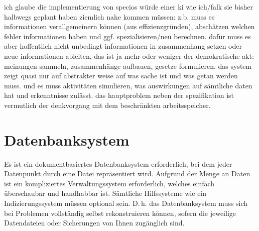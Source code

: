 ich glaube die implementierung von specios würde einer ki wie ich/falk sie bisher halbwegs geplant haben ziemlich nahe kommen müssen:
z.b. muss es informationen verallgemeinern können (aus effizienzgründen), abschätzen welchen fehler informationen haben und ggf. spezialisieren/neu berechnen. dafür muss es aber hoffentlich nicht unbedingt informationen in zusammenhang setzen oder neue informationen ableiten, das ist ja mehr oder weniger der demokratische akt: meinungen sammeln, zusammenhänge aufbauen, gesetze formulieren. das system zeigt quasi nur auf abstrakter weise auf was sache ist und was getan werden muss.
und es muss aktivitäten simulieren, was auswirkungen auf sämtliche daten hat und erkenntnisse zulässt.
das hauptproblem neben der spezifikation ist vermutlich der denkvorgang mit dem beschränkten arbeitsspeicher.

\section{Datenbanksystem}\label{sec:database}

Es ist ein dokumentbasiertes Datenbanksystem erforderlich, bei dem jeder Datenpunkt durch eine Datei repräsentiert wird. Aufgrund der Menge an Daten ist ein kompliziertes Verwaltungssystem erforderlich, welches einfach überschaubar und handhabbar ist. Sämtliche Hilfssysteme wie ein Indizierungssystem müssen optional sein. D.\,h. das Datenbanksystem muss sich bei Problemen vollständig selbst rekonstruieren können, sofern die jeweilige Datendateien oder Sicherungen von Ihnen zugänglich sind.

